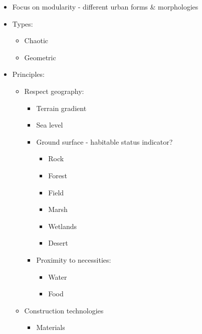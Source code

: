\documentclass[]{article}
\begin{document}
\begin{itemize}
\itemsep1pt\parskip0pt
\item
  Focus on modularity - different urban forms \& morphologies
\item
  Types:

  \begin{itemize}
  \itemsep1pt\parskip0pt
  \item
    Chaotic
  \item
    Geometric
  \end{itemize}
\item
  Principles:

  \begin{itemize}
  \itemsep1pt\parskip0pt
  \item
    Respect geography:

    \begin{itemize}
    \itemsep1pt\parskip0pt
    \item
      Terrain gradient
    \item
      Sea level
    \item
      Ground surface - habitable status indicator?

      \begin{itemize}
      \itemsep1pt\parskip0pt
      \item
        Rock
      \item
        Forest
      \item
        Field
      \item
        Marsh
      \item
        Wetlands
      \item
        Desert
      \end{itemize}
    \item
      Proximity to necessities:

      \begin{itemize}
      \itemsep1pt\parskip0pt
      \item
        Water
      \item
        Food
      \end{itemize}
    \end{itemize}
  \item
    Construction technologies

    \begin{itemize}
    \itemsep1pt\parskip0pt
    \item
      Materials


\end{itemize}
\end{itemize}
\end{itemize}
\end{document}
